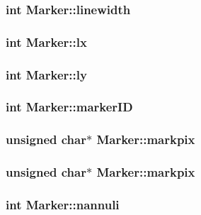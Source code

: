 \subsubsection{\setlength{\rightskip}{0pt plus 5cm}int \bf{Marker::linewidth}}\label{structMarker_4f313f89cb8b18978f3f81c9e5a94b69}


\subsubsection{\setlength{\rightskip}{0pt plus 5cm}int \bf{Marker::lx}}\label{structMarker_7444fd2ccce453e21154642b5572ef6e}


\subsubsection{\setlength{\rightskip}{0pt plus 5cm}int \bf{Marker::ly}}\label{structMarker_50a70e1895689e853536bb161132de10}


\subsubsection{\setlength{\rightskip}{0pt plus 5cm}int \bf{Marker::marker\-ID}}\label{structMarker_7801f26561c413ad472acd281b4518a3}


\subsubsection{\setlength{\rightskip}{0pt plus 5cm}unsigned char$\ast$ \bf{Marker::markpix}}\label{structMarker_a7cdd1dc86488d39a9bdaf61338e9187}


\subsubsection{\setlength{\rightskip}{0pt plus 5cm}unsigned char$\ast$ \bf{Marker::markpix}}\label{structMarker_a7cdd1dc86488d39a9bdaf61338e9187}


\subsubsection{\setlength{\rightskip}{0pt plus 5cm}int \bf{Marker::nannuli}}\label{structMarker_9e7b1eb50517c91362677d2a787360f0}


